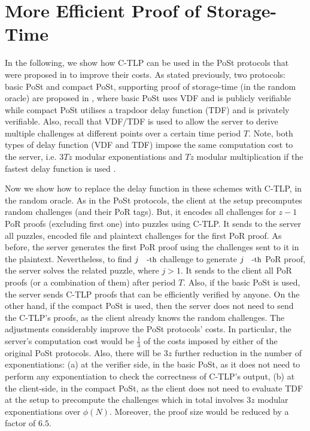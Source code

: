 
\section{More Efficient Proof of Storage-Time}\label{More-Efficient-Proof-of-Storage-Time}

In the following, we show how C-TLP can be used in the PoSt protocols that were proposed in  \cite{Storage-Time} to improve their costs. As stated previously,  two protocols: basic PoSt and compact PoSt, supporting proof of storage-time (in the random oracle) are proposed in \cite{Storage-Time}, where  basic PoSt uses VDF and is publicly verifiable while compact PoSt  utilises a trapdoor delay function (TDF) and is privately verifiable. Also, recall that VDF/TDF is used to allow the server to derive multiple challenges at different points over a certain time period $T$. Note, both types of delay function (VDF and TDF) impose the same computation cost to the server, i.e. $3Tz$ modular exponentiations and $Tz$ modular multiplication if the fastest delay function is used \cite{Wesolowski19}. 

Now we show how to replace the delay function in these schemes with C-TLP, in the random oracle.  As in the PoSt protocols, the client at the setup precomputes random challenges (and their PoR tags). But, it encodes all challenges for $z-1$ PoR proofs (excluding first one)  into puzzles using C-TLP. It sends to the server all puzzles, encoded file and plaintext challenges for the first PoR proof. As before, the server generates the first PoR proof using the challenges sent to it in the plaintext. Nevertheless, to find $j\text{\small{-th}}$ challenge to generate  $j\text{\small{-th}}$ PoR proof, the server solves the related puzzle, where $j>1$. It sends to the client all PoR proofs (or a combination of them) after period $T$. Also, if the basic PoSt  is used,  the server sends C-TLP proofs that can be efficiently verified by anyone. On the other hand, if the compact PoSt is used, then the server does not need to send the C-TLP's proofs, as the client already knows the random challenges. The adjustments considerably improve the PoSt protocols' costs. In particular,  the server's computation cost would be $\frac{1}{3}$ of the costs imposed by either of the original PoSt protocols. Also,  there will be $3z$ further reduction in the number of exponentiations:  (a) at the verifier side, in the basic PoSt, as it does not need to perform any exponentiation to check the correctness of C-TLP's output,  (b) at the client-side, in the compact PoSt,  as the client does not need to evaluate TDF at the setup to precompute the challenges which in total involves $3z$ modular exponentiations over $\phi(N)$. Moreover, the proof size would be reduced by a factor of $6.5$.

